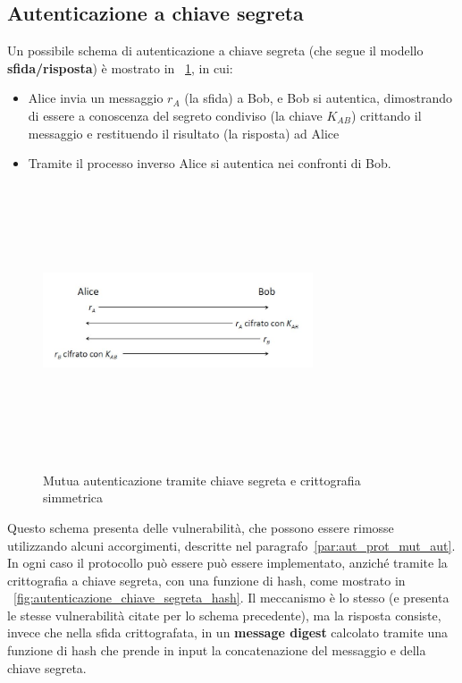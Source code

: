 \subsection{Autenticazione a chiave segreta}
Un possibile schema di autenticazione a chiave segreta (che segue il modello \textbf{sfida/risposta}) è mostrato in \figurename~\ref{fig:autenticazione_chiave_segreta_crit}, in cui:
\begin{itemize}
\item Alice invia un messaggio $r_A$ (la sfida) a Bob, e Bob si autentica, dimostrando di essere a conoscenza del segreto condiviso (la chiave $K_{AB}$) crittando il messaggio e restituendo il risultato (la risposta) ad Alice
\item Tramite il processo inverso Alice si autentica nei confronti di Bob.
\end{itemize}
\begin{figure}
	\begin{center}
	{\includegraphics[height=8cm, width=8cm, keepaspectratio]{Immagini/hash/schema_autenticazione.JPG}}
	\caption{Mutua autenticazione tramite chiave segreta e crittografia simmetrica\label{fig:autenticazione_chiave_segreta_crit}}
	\end{center}
\end{figure}
Questo schema presenta delle vulnerabilità, che possono essere rimosse utilizzando alcuni accorgimenti, descritte nel paragrafo~\ref{par:aut_prot_mut_aut}. In ogni caso il protocollo può essere può essere implementato, anziché tramite la crittografia a chiave segreta, con una funzione di hash, come mostrato in \figurename~\ref{fig:autenticazione_chiave_segreta_hash}. Il meccanismo è lo stesso (e presenta le stesse vulnerabilità citate per lo schema precedente), ma la risposta consiste, invece che nella sfida crittografata, in un \textbf{message digest} calcolato tramite una funzione di hash che prende in input la concatenazione del messaggio e della chiave segreta.
